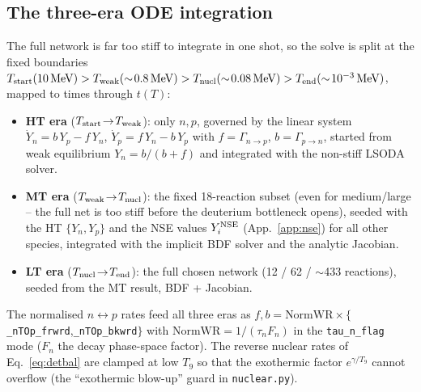 \documentclass[11pt,a4paper]{article}
\newcommand{\code}[1]{\texttt{#1}}
\begin{document}
\subsection{The three-era ODE integration}\label{sec:eras}
The full network is far too stiff to integrate in one shot, so the solve is
split at the fixed boundaries
$T_{\rm start}(10\,\mathrm{MeV})>T_{\rm weak}(\sim\!0.8\,\mathrm{MeV})>
T_{\rm nucl}(\sim\!0.08\,\mathrm{MeV})>T_{\rm end}(\sim\!10^{-3}\,\mathrm{MeV})$,
mapped to times through $t(T)$:
\begin{itemize}\itemsep2pt
  \item \textbf{HT era} ($T_{\rm start}\!\to\!T_{\rm weak}$): only $n,p$, governed
    by the linear system
    $\dot Y_n=b\,Y_p-f\,Y_n$, $\dot Y_p=f\,Y_n-b\,Y_p$ with
    $f=\Gamma_{n\to p}$, $b=\Gamma_{p\to n}$, started from weak equilibrium
    $Y_n=b/(b+f)$ and integrated with the non-stiff LSODA solver.
  \item \textbf{MT era} ($T_{\rm weak}\!\to\!T_{\rm nucl}$): the fixed
    18-reaction subset (even for medium/large -- the full net is too stiff before
    the deuterium bottleneck opens), seeded with the HT $\{Y_n,Y_p\}$ and the NSE
    values $Y_i^{\rm NSE}$ (App.~\ref{app:nse}) for all other species, integrated
    with the implicit BDF solver and the analytic Jacobian.
  \item \textbf{LT era} ($T_{\rm nucl}\!\to\!T_{\rm end}$): the full chosen
    network (12 / 62 / $\sim$433 reactions), seeded from the MT result, BDF +
    Jacobian.
\end{itemize}
The normalised $n\!\leftrightarrow\!p$ rates feed all three eras as
$f,b=\text{NormWR}\times\{$\code{\_nTOp\_frwrd},\code{\_nTOp\_bkwrd}$\}$ with
$\text{NormWR}=1/(\tau_n F_n)$ in the \code{tau\_n\_flag} mode ($F_n$ the decay
phase-space factor). The reverse nuclear rates of Eq.~\eqref{eq:detbal} are
clamped at low $T_9$ so that the exothermic factor $e^{\gamma/T_9}$ cannot
overflow (the ``exothermic blow-up'' guard in \code{nuclear.py}).
\end{document}
